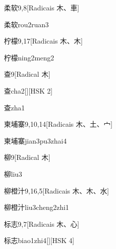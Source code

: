 \begin{entry}{柔软}{9,8}[Radicais ⽊、⾞]
  \begin{phonetics}{柔软}{rou2ruan3}
  \end{phonetics}
\end{entry}

\begin{entry}{柠檬}{9,17}[Radicais ⽊、⽊]
  \begin{phonetics}{柠檬}{ning2meng2}
  \end{phonetics}
\end{entry}

\begin{entry}{查}{9}[Radical ⽊]
  \begin{phonetics}{查}{cha2}[][HSK 2]
  \end{phonetics}
  \begin{phonetics}{查}{zha1}
  \end{phonetics}
\end{entry}

\begin{entry}{柬埔寨}{9,10,14}[Radicais ⽊、⼟、⼧]
  \begin{phonetics}{柬埔寨}{jian3pu3zhai4}
  \end{phonetics}
\end{entry}

\begin{entry}{柳}{9}[Radical ⽊]
  \begin{phonetics}{柳}{liu3}
  \end{phonetics}
\end{entry}

\begin{entry}{柳橙汁}{9,16,5}[Radicais ⽊、⽊、⽔]
  \begin{phonetics}{柳橙汁}{liu3cheng2zhi1}
  \end{phonetics}
\end{entry}

\begin{entry}{标志}{9,7}[Radicais ⽊、⼼]
  \begin{phonetics}{标志}{biao1zhi4}[][HSK 4]
  \end{phonetics}
\end{entry}

